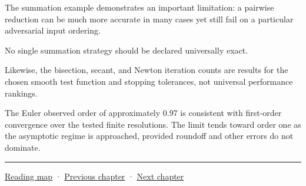 The summation example demonstrates an important limitation: a pairwise reduction can be much more accurate in many cases yet still fail on a particular adversarial input ordering.

No single summation strategy should be declared universally exact.

Likewise, the bisection, secant, and Newton iteration counts are results for the chosen smooth test function and stopping tolerances, not universal performance rankings.

The Euler observed order of approximately 0.97 is consistent with first-order convergence over the tested finite resolutions. The limit tends toward order one as the asymptotic regime is approached, provided roundoff and other errors do not dominate.

\begin{center}\rule{0.5\linewidth}{0.5pt}\end{center}

\hyperref[volume-reading-map]{Reading map} · \hyperref[02-foundations-ii-ch030-monte-carlo-estimates-and-uncertainty-metrics]{Previous chapter} · \hyperref[02-foundations-ii-ch032-geometry-becomes-an-image-and-an-inverse-problem]{Next chapter}
